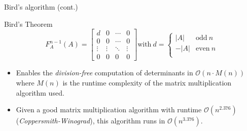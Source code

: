 \documentclass{beamer}
\begin{document}
\begin{frame}{Bird's algorithm (cont.)}

    \begin{block}{Bird's Theorem}
        \[
            F_A^{n-1}(A) =
            \begin{bmatrix}{}
                d      & 0      & \cdots & 0 \\
                0      & 0      & \cdots & 0 \\
                \vdots & \vdots & \ddots & \vdots \\
                0      & 0      & 0      & 0
            \end{bmatrix}
            \text{with} \ d =
            \begin{cases}{}
                |A|  & \text{odd} \ n \\
                -|A| & \text{even} \ n \\
            \end{cases}
        \]
    \end{block}

    \begin{itemize}

        \item Enables the \emph{division-free} computation of determinants in
            $\mathcal{O}(n\cdot M(n))$ where $M(n)$ is the runtime complexity of the matrix
            multiplication algorithm used.

        \item Given a good matrix multiplication algorithm with runtime $\mathcal{O}(n^{2.376})$
            (\emph{Coppersmith-Winograd}),
            this algorithm runs in $\mathcal{O}(n^{3.376})$.

    \end{itemize}

\end{frame}
\end{document}
